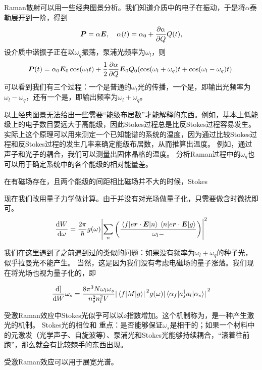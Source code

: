Raman散射可以用一些经典图景分析。我们知道介质中的电子在振动，于是将$\alpha$泰勒展开到一阶，得到
\begin{equation}
    \vb*{P} = \alpha \vb*{E}, \quad \alpha(t) = \alpha_0 + \pdv{\alpha}{Q} Q(t),
\end{equation}
设介质中谐振子正在以$\omega_q$振荡，泵浦光频率为$\omega_l$，则
\begin{equation}
    \vb*{P}(t) = \alpha_0 \vb*{E}_0 \cos(\omega_l t) + \frac{1}{2} \pdv{\alpha}{Q} \vb*{E}_0 Q_0 (\cos(\omega_l + \omega_q) t + \cos(\omega_l - \omega_q)t).
\end{equation}
可以看到我们有三个过程：一个是普通的$\omega_l$光的传播，一个是，即输出光频率为$\omega_l - \omega_q$，还有一个是，即输出频率为$\omega_l + \omega_q$。

以上经典图景无法给出一些需要“能级布居数”才能解释的东西。例如，基本上低能级上的电子数目要远大于高能级，因此Stokes过程总是比反Stokes过程容易发生。
实际上这个原理可以用来测定一个已知能谱的系统的温度，因为通过比较Stokes过程和反Stokes过程的发生几率来确定能级布居数，从而推算出温度。
例如，通过声子和光子的耦合，我们可以测量出固体晶格的温度。
分析Raman过程中的$\omega_q$也可以用于确定系统中的各个能级的相对能量差。

在有磁场存在，且两个能级的间距相比磁场并不大的时候，Stokes

现在我们改用量子力学做计算。由于并没有对光场做量子化，只需要做含时微扰即可。
\[
    \dv{W}{\omega} = \frac{2\pi}{\hbar} g(\omega) \abs{\sum_n \left(
        \frac{\mel*{f}{e \vb*{r} \cdot \vb*{E}}{n} \mel*{n}{e \vb*{r} \cdot \vb*{E}}{g}}{\omega_l - }
    \right)}^2
\]

我们在这里遇到了之前遇到过的类似的问题：如果没有频率为$\omega_l + \omega_q$的种子光，似乎拉曼光不能产生。
当然，这是因为我们没有考虑电磁场的量子涨落。我们现在将光场也视为量子化的，即

\begin{equation}
    \dv]{W}{\omega_s} = \frac{8\pi^3 N \omega_l \omega_s}{n_s^2 n_l^2 V} \abs*{\mel{f}{M}{g}}^2 g(\omega) \abs*{\mel*{\alpha_f}{a_s^\dagger a_l}{\alpha_s}}^2
\end{equation}

受激Raman效应中Stokes光似乎可以以$\ee$指数增加。这个机制称为，是一种产生激光的机制。
Stokes光的相位和
重点：是否能够保证$\omega_s$是相干的；如果一个材料中的元激发（光学声子、自旋波等）、泵浦光和Stokes光能够持续耦合，“滚着往前跑”，那么就会有比较棘手的东西出现。

受激Raman效应可以用于展宽光谱。

